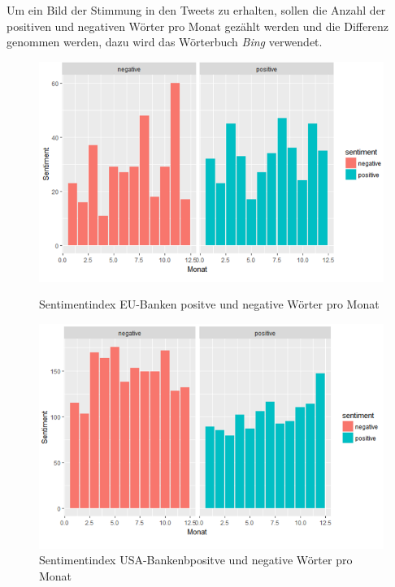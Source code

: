 Um ein Bild der Stimmung in den Tweets zu erhalten, sollen die Anzahl der positiven und negativen Wörter pro Monat gezählt werden und die Differenz genommen werden, dazu wird das Wörterbuch \textit{Bing} verwendet.
\begin{figure}[H]
	\begin{minipage}[b]{.4\linewidth} %
		\includegraphics[width=1\textwidth]{EUpostneg.png}
		\caption{Sentimentindex EU-Banken positve und negative Wörter pro Monat} \label{eusent}
	\end{minipage}
	\hspace{.1\linewidth}%
	\begin{minipage}[b]{.4\linewidth} %
		\includegraphics[width=1\textwidth]{USApostneg.png}
		\caption{Sentimentindex USA-Bankenbpositve und negative Wörter pro Monat}\label{usasent}
	\end{minipage}


\end{figure}
